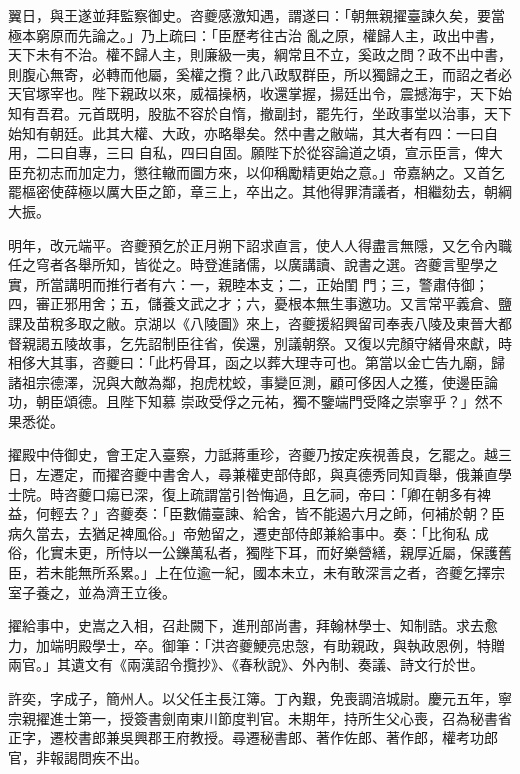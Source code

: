 \begin{pinyinscope}
 翼日，與王遂並拜監察御史。咨夔感激知遇，謂遂曰：「朝無親擢臺諫久矣，要當極本窮原而先論之。」乃上疏曰：「臣歷考往古治
 亂之原，權歸人主，政出中書，天下未有不治。權不歸人主，則廉級一夷，綱常且不立，奚政之問？政不出中書，則腹心無寄，必轉而他屬，奚權之攬？此八政馭群臣，所以獨歸之王，而詔之者必天官塚宰也。陛下親政以來，威福操柄，收還掌握，揚廷出令，震撼海宇，天下始知有吾君。元首既明，股肱不容於自惰，撤副封，罷先行，坐政事堂以治事，天下始知有朝廷。此其大權、大政，亦略舉矣。然中書之敝端，其大者有四：一曰自用，二曰自專，三曰
 自私，四曰自固。願陛下於從容論道之頃，宣示臣言，俾大臣充初志而加定力，懲往轍而圖方來，以仰稱勵精更始之意。」帝嘉納之。又首乞罷樞密使薛極以厲大臣之節，章三上，卒出之。其他得罪清議者，相繼劾去，朝綱大振。



 明年，改元端平。咨夔預乞於正月朔下詔求直言，使人人得盡言無隱，又乞令內職任之穹者各舉所知，皆從之。時登進諸儒，以廣講讀、說書之選。咨夔言聖學之實，所當講明而推行者有六：一，親睦本支；二，正始閨
 門；三，警肅侍御；四，審正邪用舍；五，儲養文武之才；六，憂根本無生事邀功。又言常平義倉、鹽課及苗稅多取之敝。京湖以《八陵圖》來上，咨夔援紹興留司奉表八陵及東晉大都督親謁五陵故事，乞先詔制臣往省，俟還，別議朝祭。又復以完顏守緒骨來獻，時相侈大其事，咨夔曰：「此朽骨耳，函之以葬大理寺可也。第當以金亡告九廟，歸諸祖宗德澤，況與大敵為鄰，抱虎枕蛟，事變叵測，顧可侈因人之獲，使邊臣論功，朝臣頌德。且陛下知慕
 崇政受俘之元祐，獨不鑒端門受降之崇寧乎？」然不果悉從。



 擢殿中侍御史，會王定入臺察，力詆蔣重珍，咨夔乃按定疾視善良，乞罷之。越三日，左遷定，而擢咨夔中書舍人，尋兼權吏部侍郎，與真德秀同知貢舉，俄兼直學士院。時咨夔口瘍已深，復上疏謂當引咎悔過，且乞祠，帝曰：「卿在朝多有裨益，何輕去？」咨夔奏：「臣數備臺諫、給舍，皆不能遏六月之師，何補於朝？臣病久當去，去猶足裨風俗。」帝勉留之，遷吏部侍郎兼給事中。奏：「比徇私
 成俗，化實未更，所恃以一公鑠萬私者，獨陛下耳，而好樂營繕，親厚近屬，保護舊臣，若未能無所系累。」上在位逾一紀，國本未立，未有敢深言之者，咨夔乞擇宗室子養之，並為濟王立後。



 擢給事中，史嵩之入相，召赴闕下，進刑部尚書，拜翰林學士、知制誥。求去愈力，加端明殿學士，卒。御筆：「洪咨夔鯁亮忠愨，有助親政，與執政恩例，特贈兩官。」其遺文有《兩漢詔令攬抄》、《春秋說》、外內制、奏議、詩文行於世。



 許奕，字成子，簡州人。以父任主長江簿。丁內艱，免喪調涪城尉。慶元五年，寧宗親擢進士第一，授簽書劍南東川節度判官。未期年，持所生父心喪，召為秘書省正字，遷校書郎兼吳興郡王府教授。尋遷秘書郎、著作佐郎、著作郎，權考功郎官，非報謁問疾不出。




\end{pinyinscope}
